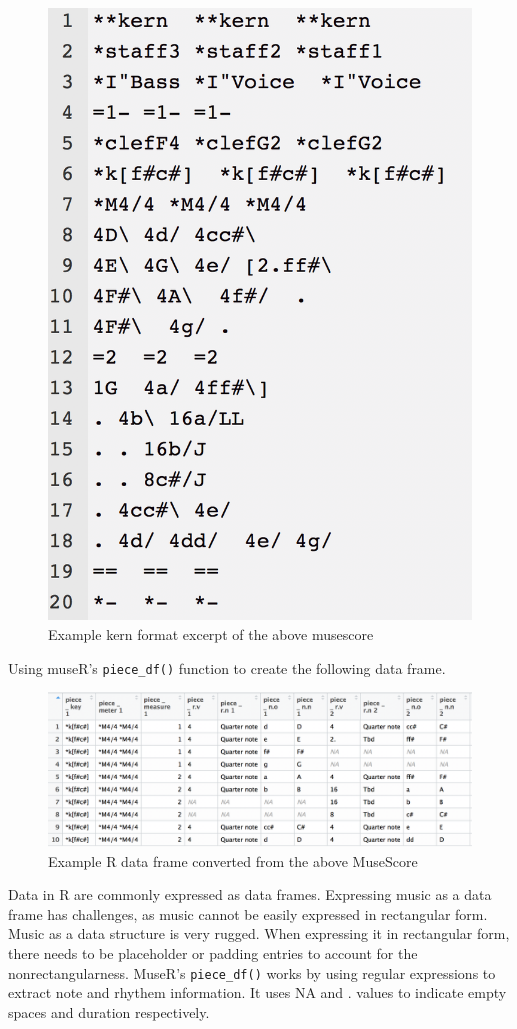 \documentclass[12pt,twoside]{reedthesis}
\theoremstyle{definition}
\theoremstyle{definition}
\theoremstyle{definition}
\theoremstyle{remark}
\begin{document}
\begin{figure}[h]
\centering
\includegraphics[scale = .5]{images/ex1k.png}
\caption{Example kern format excerpt of the above musescore}
\label{subd}
\end{figure}
Using museR's \texttt{piece\_df()} function to create the following data
frame.
\begin{figure}[h]
\centering
\includegraphics[scale = .5]{images/ex1r.png}
\caption{Example R data frame converted from the above MuseScore}
\label{subd}
\end{figure}
Data in R are commonly expressed as data frames. Expressing music as a
data frame has challenges, as music cannot be easily expressed in
rectangular form. Music as a data structure is very rugged. When
expressing it in rectangular form, there needs to be placeholder or
padding entries to account for the nonrectangularness. MuseR's
\texttt{piece\_df()} works by using regular expressions to extract note
and rhythem information. It uses NA and . values to indicate empty
spaces and duration respectively.
\end{document}
